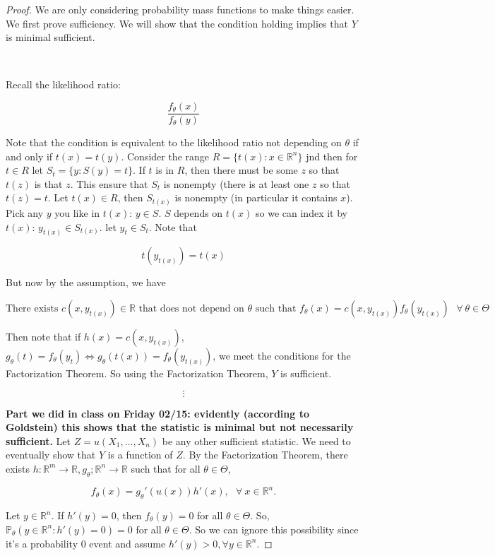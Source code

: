 \begin{proof} We are only considering probability mass functions to make things easier. We first prove sufficiency. We will show that the condition holding implies that \(Y\) is minimal sufficient.

\

Recall the likelihood ratio:

\[
\frac{f_\theta(x)}{f_\theta(y)}
\]

Note that the condition is equivalent to the likelihood ratio not depending on \(\theta\) if and only if \(t(x) = t(y)\). Consider the range \(R=\{t(x): x \in \mathbb{R}^n\}\) jnd then for \(t \in R\) let \(S_t = \{y: S(y)= t\}\). If \(t\) is in \(R\), then there must be some \(z\) so that \(t(z)\) is that \(z\). This ensure that \(S_t\) is nonempty (there is at least one \(z\) so that \(t(z) = t\). Let \(t(x) \in R\), then \(S_{t(x)}\) is nonempty (in particular it contains \(x\)).  Pick any \(y\) you like in \(t(x)\): \(y \in S\). \(S\) depends on \(t(x)\) so we can index it by \(t(x)\): \(y_{t(x)} \in S_{t(x)}\). let \(y_t \in S_t\). Note that 

\[
t(y_{t(x)}) = t(x)
\]

But now by the assumption, we have

\[
\text{There exists } c(x,y_{t(x)}) \in \mathbb{R} \text{ that does not depend on } \theta \text{ such that } f_\theta(x) = c(x,y_{t(x)}) f_\theta(y_{t(x)}) \ \ \ \forall \ \theta \in \Theta 
\]

%

Then note that if \(h(x) =  c(x,y_{t(x)})\), \(g_\theta(t) = f_\theta(y_t) \iff g_\theta(t(x)) =  f_\theta(y_{t(x)})\), we meet the conditions for the Factorization Theorem. So using the Factorization Theorem, \(Y\) is sufficient.

\[
\vdots
\]

\textbf{Part we did in class on Friday 02/15: evidently (according to Goldstein) this shows that the statistic is minimal but not necessarily sufficient.} Let \(Z = u(X_1, \ldots, X_n)\) be any other sufficient statistic. We need to eventually show that \(Y\) is a function of \(Z\). By the Factorization Theorem, there exists \(h: \mathbb{R}^m \to \mathbb{R}, g_\theta; \mathbb{R}^n \to \mathbb{R}\) such that for all \(\theta \in \Theta\), 

\[
f_\theta(x) = g_\theta'(u(x))h'(x), \ \ \ \forall \ x \in \mathbb{R}^n.
\]

Let \(y \in \mathbb{R}^n\). If \(h'(y) = 0\), then \(f_\theta(y) = 0\) for all \(\theta \in \Theta\). So, \(\mathbb{P}_\theta(y \in \mathbb{R}^n : h'(y) =0) = 0\) for all \(\theta \in \Theta\). So we can ignore this possibility since it's a probability 0 event and assume \(h'(y) > 0, \forall y \in \mathbb{R}^n\).


\end{proof}
